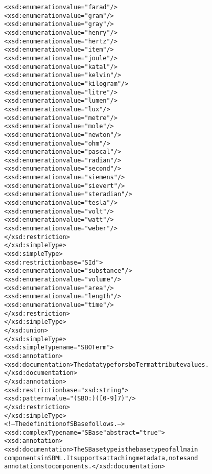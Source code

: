 \begin{alltt}
                    <xsd:enumeration value="farad"/>
                    <xsd:enumeration value="gram"/>
                    <xsd:enumeration value="gray"/>
                    <xsd:enumeration value="henry"/>
                    <xsd:enumeration value="hertz"/>
                    <xsd:enumeration value="item"/>
                    <xsd:enumeration value="joule"/>
                    <xsd:enumeration value="katal"/>
                    <xsd:enumeration value="kelvin"/>
                    <xsd:enumeration value="kilogram"/>
                    <xsd:enumeration value="litre"/>
                    <xsd:enumeration value="lumen"/>
                    <xsd:enumeration value="lux"/>
                    <xsd:enumeration value="metre"/>
                    <xsd:enumeration value="mole"/>
                    <xsd:enumeration value="newton"/>
                    <xsd:enumeration value="ohm"/>
                    <xsd:enumeration value="pascal"/>
                    <xsd:enumeration value="radian"/>
                    <xsd:enumeration value="second"/>
                    <xsd:enumeration value="siemens"/>
                    <xsd:enumeration value="sievert"/>
                    <xsd:enumeration value="steradian"/>
                    <xsd:enumeration value="tesla"/>
                    <xsd:enumeration value="volt"/>
                    <xsd:enumeration value="watt"/>
                    <xsd:enumeration value="weber"/>
                </xsd:restriction>
            </xsd:simpleType>
            <xsd:simpleType>
                <xsd:restriction base="SId">
                    <xsd:enumeration value="substance"/>
                    <xsd:enumeration value="volume"/>
                    <xsd:enumeration value="area"/>
                    <xsd:enumeration value="length"/>
                    <xsd:enumeration value="time"/>
                </xsd:restriction>
            </xsd:simpleType>
        </xsd:union>
    </xsd:simpleType>
    <xsd:simpleType name="SBOTerm">
        <xsd:annotation>
            <xsd:documentation>The data type for sboTerm attribute values.</xsd:documentation>
        </xsd:annotation>
        <xsd:restriction base="xsd:string">
            <xsd:pattern value="(SBO:)([0-9]{7})"/>
        </xsd:restriction>
    </xsd:simpleType>
    <!--The definition of SBase follows.-->
    <xsd:complexType name="SBase" abstract="true">
        <xsd:annotation>
            <xsd:documentation>The SBase type is the base type of all main
            components in SBML.  It supports attaching metadata, notes and
            annotations to components.</xsd:documentation>

\end{alltt}
